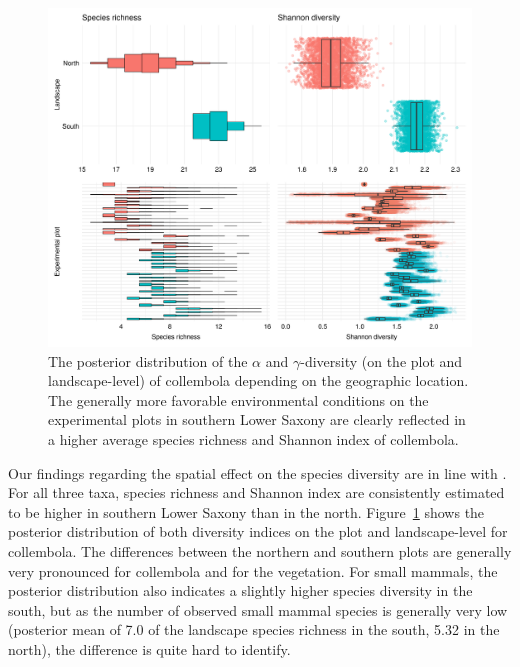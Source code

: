 \documentclass{article}
\begin{document}
\begin{figure}
\centering
\includegraphics[width=\linewidth]{figures/rtg-diversity-col-geo}
\caption{The posterior distribution of the $\alpha$ and $\gamma$-diversity (on the plot and landscape-level) of collembola depending on the geographic location. The generally more favorable environmental conditions on the experimental plots in southern Lower Saxony are clearly reflected in a higher average species richness and Shannon index of collembola.}
\label{fig:rtg-diversity-col-geo}
\end{figure}

Our findings regarding the spatial effect on the species diversity are in line with \citet{glatthornSpecies2023}. For all three taxa, species richness and Shannon index are consistently estimated to be higher in southern Lower Saxony than in the north. Figure~\ref{fig:rtg-diversity-col-geo} shows the posterior distribution of both diversity indices on the plot and landscape-level for collembola. The differences between the northern and southern plots are generally very pronounced for collembola and for the vegetation. For small mammals, the posterior distribution also indicates a slightly higher species diversity in the south, but as the number of observed small mammal species is generally very low (posterior mean of 7.0 of the landscape species richness in the south, 5.32 in the north), the difference is quite hard to identify.
\end{document}
